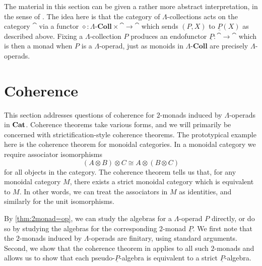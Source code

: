 \begin{rem}
The material in this section can be given a rather more abstract interpretation, in the sense of \cite{KL97}. The idea here is that the category of $\Lambda$-collections acts on the category $\cat$ via a functor $\diamond \colon \Lambda\text{-}\mathbf{Coll} \times \cat \rightarrow \cat$ which sends $(P,X)$ to $\underline{P}(X)$ as described above. Fixing a $\Lambda$-collection $P$ produces an endofunctor $\underline{P} \colon \cat \rightarrow \cat$ which is then a monad when $P$ is a $\Lambda$-operad, just as monoids in $\Lambda\text{-}\mathbf{Coll}$ are precisely $\Lambda$-operads.
\end{rem}

\section{Coherence}

This section addresses questions of coherence for $2$-monads induced by $\Lambda$-operads in $\mathbf{Cat}$. Coherence theorems take various forms, and we will primarily be concerned with strictification-style coherence theorems. The prototypical example here is the coherence theorem for monoidal categories. In a monoidal category we require associator isomorphisms
    \[
        \left( A \otimes B \right) \otimes C \cong A \otimes \left( B \otimes C \right)
    \]
for all objects in the category. The coherence theorem tells us that, for any monoidal category $M$, there exists a strict monoidal category which is equivalent to $M$. In other words, we can treat the associators in $M$ as identities, and similarly for the unit isomorphisms.



By \cref{thm:2monad=op}, we can study the algebras for a $\Lambda$-operad $P$ directly, or do so by studying the algebras for the corresponding $2$-monad $\underline{P}$. We first note that the $2$-monads induced by $\Lambda$-operads are finitary, using standard arguments. Second, we show that the coherence theorem in \cite{lack-cod} applies to all such $2$-monads and allows us to show that each pseudo-$\underline{P}$-algebra is equivalent to a strict $\underline{P}$-algebra. 

